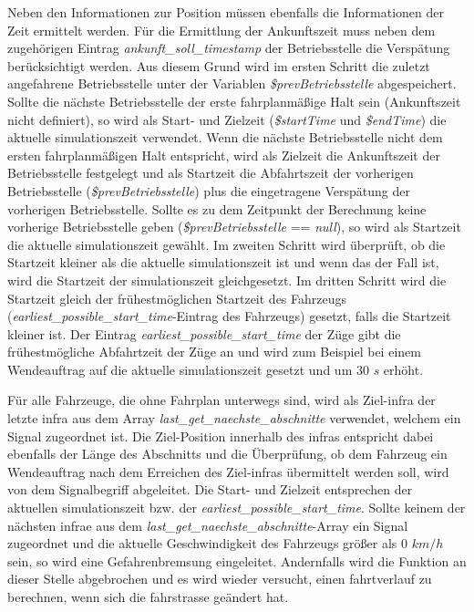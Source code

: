 Neben den Informationen zur Position müssen ebenfalls die Informationen der Zeit ermittelt werden. Für die Ermittlung der Ankunftszeit muss neben dem zugehörigen Eintrag \textit{ankunft\_soll\_timestamp} der Betriebsstelle die Verspätung berücksichtigt werden. Aus diesem Grund wird im ersten Schritt die zuletzt angefahrene Betriebsstelle unter der Variablen \textit{\$prevBetriebsstelle} abgespeichert. Sollte die nächste Betriebsstelle der erste fahrplanmäßige Halt sein (Ankunftszeit nicht definiert), so wird als Start- und Zielzeit (\textit{\$startTime} und \textit{\$endTime}) die aktuelle \Gls{simulationszeit} verwendet. Wenn die nächste Betriebsstelle nicht dem ersten fahrplanmäßigen Halt entspricht, wird als Zielzeit die Ankunftszeit der Betriebsstelle festgelegt und als Startzeit die Abfahrtszeit der vorherigen Betriebsstelle (\textit{\$prevBetriebsstelle}) plus die eingetragene Verspätung der vorherigen Betriebsstelle. Sollte es zu dem Zeitpunkt der Berechnung keine vorherige Betriebsstelle geben (\textit{\$prevBetriebsstelle} == \textit{null}), so wird als Startzeit die aktuelle \Gls{simulationszeit} gewählt. Im zweiten Schritt wird überprüft, ob die Startzeit kleiner als die aktuelle \Gls{simulationszeit} ist und wenn das der Fall ist, wird die Startzeit der \Gls{simulationszeit} gleichgesetzt. Im dritten Schritt wird die Startzeit gleich der frühestmöglichen Startzeit des Fahrzeugs (\textit{earliest\_possible\_start\_time}-Eintrag des Fahrzeugs) gesetzt, falls die Startzeit kleiner ist. Der Eintrag \textit{earliest\_possible\_start\_time} der Züge gibt die frühestmögliche Abfahrtzeit der Züge an und wird zum Beispiel bei einem Wendeauftrag auf die aktuelle \Gls{simulationszeit} gesetzt und um 30 $s$ erhöht. 

Für alle Fahrzeuge, die ohne Fahrplan unterwegs sind, wird als Ziel-\ac{infra} der letzte \ac{infra} aus dem Array \textit{last\_get\_naechste\_abschnitte} verwendet, welchem ein Signal zugeordnet ist. Die Ziel-Position innerhalb des \ac{infra}s entspricht dabei ebenfalls der Länge des Abschnitts und die Überprüfung, ob dem Fahrzeug ein Wendeauftrag nach dem Erreichen des Ziel-\ac{infra}s übermittelt werden soll, wird von dem Signalbegriff abgeleitet. Die Start- und Zielzeit entsprechen der aktuellen \Gls{simulationszeit} bzw. der \textit{earliest\_possible\_start\_time}. Sollte keinem der nächsten \ac{infra}e aus dem \textit{last\_get\_naechste\_abschnitte}-Array ein Signal zugeordnet und die aktuelle Geschwindigkeit des Fahrzeugs größer als 0 $km/h$ sein, so wird eine Gefahrenbremsung eingeleitet. Andernfalls wird die Funktion an dieser Stelle abgebrochen und es wird wieder versucht, einen \Gls{fahrtverlauf} zu berechnen, wenn sich die \Gls{fahrstrasse} geändert hat.

